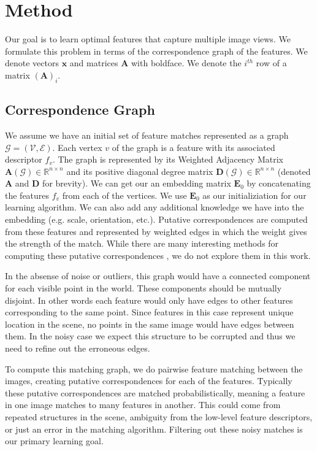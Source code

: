 \documentclass[10pt,twocolumn,letterpaper]{article}
\newcommand{\bR}{\mathbb{R}}
\newcommand{\mat}[1]{\mathbf{#1}}
\begin{document}
\section{Method}
Our goal is to learn optimal features that capture multiple image views.
We formulate this problem in terms of the correspondence graph of the features.
We denote vectors $\mat{x}$ and matrices $\mat{A}$ with boldface.
We denote the $i^{th}$ row of a matrix $(\mat{A})_i$.
\subsection{Correspondence Graph}
We assume we have an initial set of feature matches represented as a graph $\mathcal{G} = (\mathcal{V}, \mathcal{E})$.
Each vertex $v$ of the graph is a feature with its associated descriptor $f_v$. 
The graph is represented by its Weighted Adjacency Matrix $\mat{A}(\mathcal{G}) \in \bR^{n \times n}$ and its positive diagonal degree matrix $\mat{D}(\mathcal{G}) \in \bR^{n \times n}$ (denoted $\mat{A}$ and $\mat{D}$ for brevity).
We can get our an embedding matrix $\mat{E}_0$ by concatenating the features $f_v$ from each of the vertices.
We use $\mat{E}_0$ as our initializiation for our learning algorithm.
We can also add any additional knowledge we have into the embedding (e.g. scale, orientation, etc.).
Putative correspondences are computed from these features and represented by weighted edges in which the weight gives the strength of the match.
While there are many interesting methods for computing these putative correspondences \cite{suh2015subgraph, yi2018learning}, we do not explore them in this work.

In the absense of noise or outliers, this graph would have a connected component for each visible point in the world.
These components should be mutually disjoint. 
In other words each feature would only have edges to other features corresponding to the same point.
Since features in this case represent unique location in the scene, no points in the same image would have edges between them.
In the noisy case we expect this structure to be corrupted and thus we need to refine out the erroneous edges.

To compute this matching graph, we do pairwise feature matching between the images, creating putative correspondences for each of the features.
Typically these putative correspondences are matched probabilistically, meaning a feature in one image matches to many features in another.
This could come from repeated structures in the scene, ambiguity from the low-level feature descriptors, or just an error in the matching algorithm.
Filtering out these noisy matches is our primary learning goal.
\end{document}
